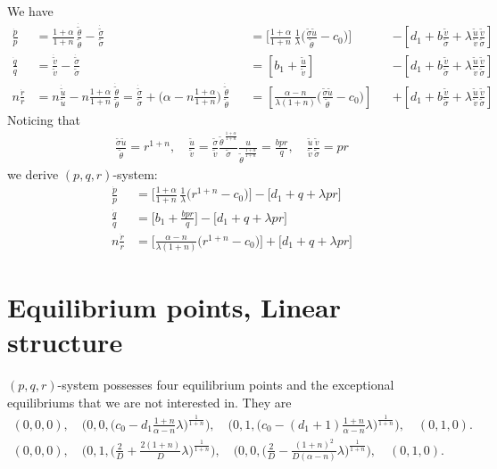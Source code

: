 \documentclass[a4paper,11pt]{article}
\def\tv{{\tilde{v}}}
\def\tth{{\tilde{\theta}}}
\def\ts{{\tilde{\sigma}}}
\def\tu{{\tilde{u}}}
\def\dtv{{\dot{\tilde{v}}}}
\def\dtth{{\dot{\tilde{\theta}}}}
\def\dts{{\dot{\tilde{\sigma}}}}
\def\dtu{{\dot{\tilde{u}}}}
\def\dpp{\dot{p}}
\def\dqq{\dot{q}}
\def\drr{\dot{r}}
\begin{document}
We have
\begin{align*}
 \frac{\dpp}{p}&=\frac{1+\alpha}{1+n}\,\frac{\dtth}{\tth} - \frac{\dts}{\ts}& &=\Big[\frac{1+\alpha}{1+n}\,\frac{1}{\lambda }\Big(\frac{\ts\tu}{\tth}-c_0\Big)\Big] & &-\left[d_1 + b\frac{\tv}{\ts} + \lambda\frac{\tu}{\tv}\frac{\tv}{\ts}\right]\\
 \frac{\dqq}{q}&=\frac{\dtv}{\tv} - \frac{\dts}{\ts}& &=\left[b_1 +\frac{\tu}{\tv}\right] & &-\left[d_1 + b\frac{\tv}{\ts} + \lambda\frac{\tu}{\tv}\frac{\tv}{\ts}\right]\\
 n\frac{\drr}{r}&=n\frac{\dtu}{\tu} -n\frac{1+\alpha}{1+n}\,\frac{\dtth}{\tth}= \frac{\dts}{\ts} + \Big(\alpha-n\frac{1+\alpha}{1+n}\Big)\,\frac{\dtth}{\tth} & &=\left[\frac{\alpha-n}{\lambda(1+n)}\Big(\frac{\ts\tu}{\tth}-c_0\Big)\right]& &+\left[d_1 + b\frac{\tv}{\ts} + \lambda\frac{\tu}{\tv}\frac{\tv}{\ts}\right]
\end{align*}
Noticing that
\begin{align*}
 \frac{\ts\tu}{\tth} = r^{1+n}, \quad \frac{\tu}{\tv} = \frac{\ts}{\tv} \frac{\tth^{\,\frac{1+\alpha}{1+n}}}{\ts} \frac{u}{\tth^{\,\frac{1+\alpha}{1+n}}} = \frac{bpr}{q}, \quad \frac{\tu}{\tv} \frac{\tv}{\ts} = pr
\end{align*}
we derive $(p,q,r)$-system:
\begin{align*}
 \frac{\dpp}{p}&=\Big[\frac{1+\alpha}{1+n}\,\frac{1}{\lambda }\Big(r^{1+n}-c_0\Big)\Big] -\Big[d_1 + q + \lambda pr\Big]\\
 \frac{\dqq}{q}&=\Big[b_1 +\frac{bpr}{q}\Big] -\Big[d_1 + q + \lambda pr\Big]\\
 n\frac{\drr}{r}&=\Big[\frac{\alpha-n}{\lambda(1+n)}\Big(r^{1+n}-c_0\Big)\Big]+\Big[d_1 + q + \lambda pr\Big]
\end{align*}

\section{Equilibrium points, Linear structure}
$(p,q,r)$-system possesses four equilibrium points and the exceptional equilibriums that we are not interested in. They are
\begin{align*}
  (0,0,0), \quad \Big(0,0,\big(c_0-d_1\frac{1+n}{\alpha-n}\lambda\big)^{\frac{1}{1+n}}\Big), \quad \Big(0,1,\big(c_0-(d_1+1)\frac{1+n}{\alpha-n}\lambda\big)^{\frac{1}{1+n}}\Big), \quad (0,1,0).\\
 (0,0,0), \quad \Big(0,1,\big(\frac{2}{D} + \frac{2(1+n)}{D} \lambda\big)^{\frac{1}{1+n}}\Big), \quad \Big(0,0,\big(\frac{2}{D} -\frac{(1+n)^2}{D(\alpha-n)} \lambda\big)^{\frac{1}{1+n}}\Big), \quad (0,1,0).
\end{align*}
\end{document}
